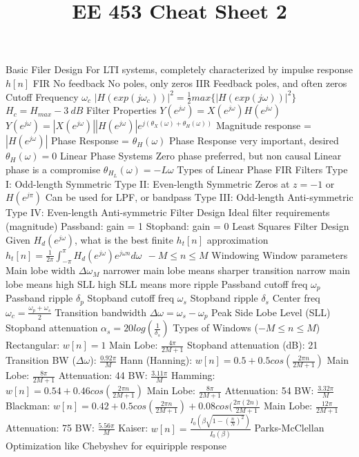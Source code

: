 \documentclass[14pt]{extarticle}
\title{EE 453 Cheat Sheet 2}
\begin{document}
	\maketitle
	
	\begin{outline}		
		\1	Basic Filer Design
			\2	For LTI systems, completely characterized by impulse response $h[n]$
			\2	FIR
				\3	No feedback
				\3	No poles, only zeros
			\2	IIR
				\3	Feedback
				\3	poles, and often zeros
			\2	Cutoff Frequency $\omega_c$
				\3	$|H(exp(j\omega_c))|^2 = \frac{1}{2}max\{|H(exp(j\omega))|^2\}$
				\3	$H_c = H_{max} - 3~dB$
		\1	Filter Properties
			\2	$Y(e^{j\omega}) = X(e^{j\omega})H(e^{j\omega})$
			\2	$Y(e^{j\omega}) = |X(e^{j\omega})||H(e^{j\omega})|e^{j(\theta_X(\omega) + \theta_H(\omega))}$
				\3	Magnitude response = $|H(e^{j\omega})|$
				\3	Phase Response = $\theta_H(\omega)$
				\3	Phase Response very important, desired $\theta_H(\omega) = 0$
			\2	Linear Phase Systems
				\3	Zero phase preferred, but non causal
				\3	Linear phase is a compromise
				\3	$\theta_{H_L} (\omega) = -L \omega$
			\2 Types of Linear Phase FIR Filters
				\3	Type   I:	Odd-length Symmetric
				\3	Type  II:	Even-length Symmetric
					\4	Zeros at $z = -1$ or $H(e^{j\pi})$
					\4	Can be used for LPF, or bandpass
				\3	Type III:	Odd-length Anti-symmetric
				\3	Type  IV:	Even-length Anti-symmetric
		\1	Filter Design
			\2	Ideal filter requirements (magnitude)
				\3	Passband:	gain = 1
				\3	Stopband:	gain = 0
			\2	Least Squares Filter Design
				\3	Given $H_d(e^{j\omega})$, what is the best finite $h_t[n]$ approximation
				\3	$h_t[n] = \frac{1}{2\pi}\int_{-\pi}^{\pi}H_d(e^{j\omega}) e^{j\omega n} d\omega~~-M \le n \le M$
		\1	Windowing
			\2	Window parameters
				\3	Main lobe width $\Delta \omega_M$
					\4	narrower main lobe means sharper transition
					\4	narrow main lobe means high SLL
					\4	high SLL means more ripple
				\3	Passband cutoff freq $\omega_p$ Passband ripple $\delta_p$
				\3	Stopband cutoff freq $\omega_s$ Stopband ripple $\delta_s$
				\3	Center freq $\omega_c = \frac{\omega_p + \omega_s}{2}$
				\3	Transition bandwidth $\Delta \omega = \omega_s - \omega_p$
				\3	Peak Side Lobe Level (SLL)
				\3	Stopband attenuation $\alpha_s = 20 log (\frac{1}{\delta_s})$
			\2	Types of Windows ($-M \le n \le M$)
				\3	Rectangular:	$w[n] = 1$
					\4	Main Lobe:	$\frac{4\pi}{2M + 1}$
					\4	Stopband attenuation (dB): 21
					\4	Transition BW ($\Delta \omega$):	$\frac{0.92\pi}{M}$
				\3	Hann (Hanning):	$w[n] = 0.5 + 0.5 cos(\frac{2\pi n}{2M + 1})$
					\4	Main Lobe:	$\frac{8\pi}{2M + 1}$
					\4	Attenuation:	44
					\4	BW:	$\frac{3.11 \pi}{M}$
				\3	Hamming:	$w[n] = 0.54 + 0.46cos(\frac{2\pi n}{2M + 1})$
					\4	Main Lobe:	$\frac{8\pi}{2M + 1}$
					\4	Attenuation:	54
					\4	BW:	$\frac{3.32 \pi}{M}$
				\3	Blackman:	$w[n] = 0.42 + 0.5 cos(\frac{2\pi n}{2M + 1}) + 
															0.08 cos(\frac{2\pi(2n)}{2M + 1}$
					\4	Main Lobe:	$\frac{12 \pi}{2M + 1}$
					\4	Attenuation:	75
					\4	BW:	$\frac{5.56 \pi}{M}$
				\3	Kaiser:	$w[n] = \frac{I_0(\beta\sqrt{1 - (\frac{n}{N})^2})}{I_0(\beta)}$
			\2	Parks-McClellan
				\3	Optimization like Chebyshev for equiripple response
	\end{outline}
\end{document}
